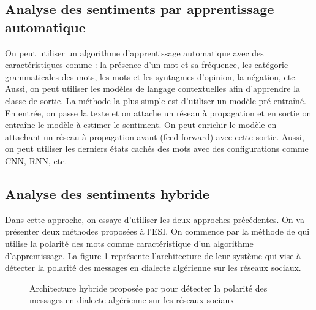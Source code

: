 \documentclass{KodeBook}
\begin{document}
\subsection{Analyse des sentiments par apprentissage automatique}

On peut utiliser un algorithme d'apprentissage automatique avec des caractéristiques comme : la présence d'un mot et sa fréquence, les catégorie grammaticales des mots, les mots et les syntagmes d'opinion, la négation, etc.
Aussi, on peut utiliser les modèles de langage contextuelles afin d'apprendre la classe de sortie. 
La méthode la plus simple est d'utiliser un modèle  pré-entraîné.
En entrée, on passe la texte et on attache un réseau à propagation et en sortie \keyword{[CLS]} on entraîne le modèle à estimer le sentiment. 
On peut enrichir le modèle en attachant un réseau à propagation avant (feed-forward) avec cette sortie. 
Aussi, on peut utiliser les derniers états cachés des mots avec des configurations comme CNN, RNN, etc.

\subsection{Analyse des sentiments hybride}

Dans cette approche, on essaye d'utiliser les deux approches précédentes.
On va présenter deux méthodes proposées à l'ESI. 
On commence par la méthode de \citet{18-bettiche-al} qui utilise la polarité des mots comme caractéristique d'un algorithme d'apprentissage.
La figure \ref{fig:asent-bettiche} représente l'architecture de leur système qui vise à détecter la polarité des messages en dialecte algérienne sur les réseaux sociaux.

\begin{figure}
	\centering
	\caption{Architecture hybride proposée par \cite{18-bettiche-al} pour détecter la polarité des messages en dialecte algérienne sur les réseaux sociaux}
	\label{fig:asent-bettiche}
\end{figure}
\end{document}

